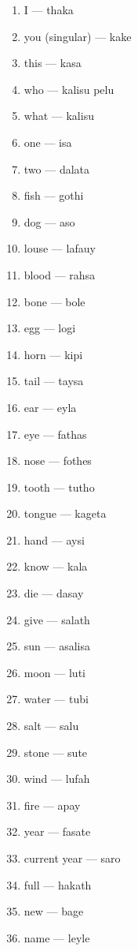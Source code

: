 \begin{multicols}{2} 
\begin{enumerate}
    \item I --- thaka
    \item you (singular) --- kake
    \item this --- kasa
    \item who --- kalisu pelu
    \item what --- kalisu
    \item one --- isa 
    \item two --- dalata
    \item fish --- gothi
    \item dog --- aso
    \item louse --- lafauy
    \item blood --- rahsa
    \item bone --- bole
    \item egg --- logi
    \item horn --- kipi
    \item tail --- taysa
    \item ear --- eyla
    \item eye --- fathas
    \item nose --- fothes
    \item tooth --- tutho
    \item tongue --- kageta
    \item hand --- aysi
    \item know --- kala
    \item die --- dasay
    \item give --- salath
    \item sun --- asalisa
    \item moon --- luti
    \item water --- tubi
    \item salt --- salu
    \item stone --- sute
    \item wind --- lufah
    \item fire --- apay
    \item year --- fasate
    \item current year --- saro
    \item full --- hakath
    \item new --- bage
    \item name --- leyle
\end{enumerate}
\end{multicols}


